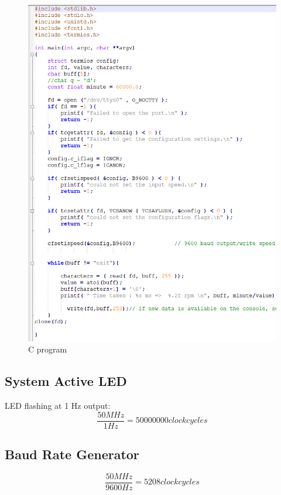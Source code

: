 \documentclass[12pt,a4paper]{article}
\begin{document}
\begin{figure}[H]
\centering
\includegraphics[width=\linewidth]{cprogram.PNG}
\caption{C program}
\label{C program}
\end{figure}

\subsection{System Active LED}
LED flashing at 1 Hz output:\\
\[ 
\frac{50 MHz}{1 Hz}= 50000000 clock cycles
\]
\subsection{Baud Rate Generator}
\[
 \frac{50 MHz}{9600 Hz}= 5208clock cycles
\]
\end{document}
